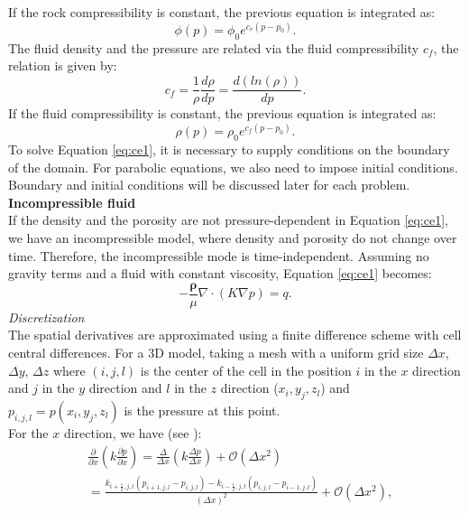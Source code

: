 \documentclass[12pt]{article}
\begin{document}
If the rock compressibility is constant, the previous equation is integrated as:
\begin{equation}\label{eq:por}
 \phi(p)=\phi_0 e^{c_r(p-p_0)}.
\end{equation}
The fluid density and the pressure are related via the fluid compressibility $c_f$, the relation is given by:
\begin{equation*}\label{eq:fc}
 c_f=\frac{1}{\rho}\frac{d\rho}{dp}=\frac{d(ln(\rho))}{dp}.
\end{equation*}
If the fluid compressibility is constant, the previous equation is integrated as:
\begin{equation}\label{eq:rhoeq}
 \rho(p)=\rho_0 e^{c_f({p}-{p}_0)}.
\end{equation}
To solve Equation \eqref{eq:ce1}, it is necessary to supply conditions on the boundary of the domain. For parabolic equations, we also need to impose initial conditions. Boundary and initial conditions will be discussed later for each problem.   \\
\textbf{Incompressible fluid}\\
If the density and the porosity are not pressure-dependent in Equation \eqref{eq:ce1}, we have an incompressible model, where density and porosity do not change over time. Therefore, the incompressible mode is time-independent. Assuming no gravity terms and a fluid with constant viscosity, Equation \eqref{eq:ce1} becomes:
\begin{equation}\label{eq:cel}
-\frac{\mathbf{\rho}}{\mu}\nabla \cdot \left({K} \nabla p\right)=q.
\end{equation}
\emph{Discretization}\\
The spatial derivatives are approximated using a finite difference scheme with cell central 
differences. For a 3D model, taking a mesh with a uniform grid size $\Delta x$, $\Delta y$, $\Delta z$ where $(i,j,l)$ is the center 
of the cell
in the position $i$ in the $x$ direction and $j$ in the $y$ direction and $l$ in the $z$ direction
($x_i,y_j,z_l$) and $p_{i,j,l}=p(x_i,y_j,z_l)$ is 
the pressure at this point.
\\ For the $x$ direction, we have (see \cite{Jansen13}):
\begin{align*}
&\frac{\partial}{\partial x}\left(k\frac{\partial p}{\partial x}\right) = 
\frac{\Delta}{\Delta x}\left(k\frac{\Delta p}{\Delta x}\right) +\mathscr{O}(\Delta x^2)\\
&=\frac{ k_{i+\frac{1}{2},j,l}(p_{i+1,j,l}-p_{i,j,l})-k_{i-\frac{1}{2},j,l}(p_{i,j,l}-p_{i-1,j,l})}{\left( \Delta x\right)^2}+\mathscr{O}(\Delta x^2),
\end{align*}
\end{document}
